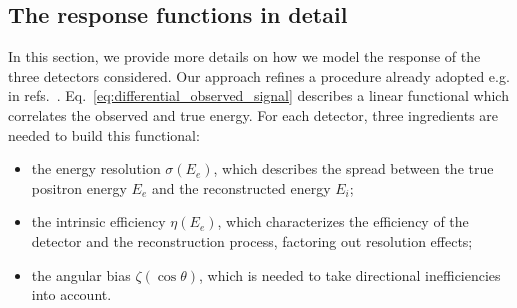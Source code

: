 \documentclass[a4paper,11pt]{article}
\begin{document}


\subsection{The response functions in detail}
\label{Sect:effres}
In this section, we provide more details on how we model the response of the three detectors  considered.  %
Our approach refines a procedure already adopted e.g. in refs.~\cite{Jegerlehner:1996kx,Vissani:2014doa}.
Eq.~\eqref{eq:differential_observed_signal} describes a linear functional which correlates  the observed and true energy. 
For each detector, three  ingredients are needed to build this functional:
\begin{itemize}
    \item[--] the energy resolution \(\sigma(E_e)\), which  describes the spread between the true positron energy \(E_e\) and the reconstructed energy \(E_i\);
    \item[--] the intrinsic efficiency \(\eta(E_e)\), which  characterizes the efficiency of the detector and the reconstruction process, factoring out resolution effects;
    \item[--] the angular bias \(\zeta(\cos\theta)\), which is needed to take directional inefficiencies into account.
\end{itemize}
\end{document}
